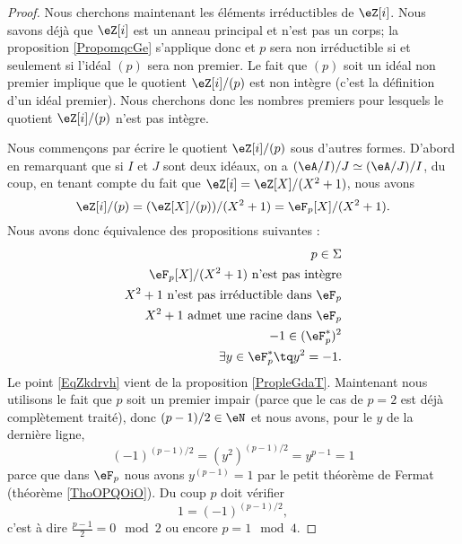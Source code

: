 \begin{proof}
    Nous cherchons maintenant les éléments irréductibles de \( \eZ[i]\). Nous savons déjà que \( \eZ[i]\) est un anneau principal et n'est pas un corps; la proposition \ref{PropomqcGe} s'applique donc et \( p\) sera non irréductible si et seulement si l'idéal \( (p)\) sera non premier. Le fait que \( (p)\) soit un idéal non premier implique que le quotient \( \eZ[i]/(p)\) est non intègre (c'est la définition d'un idéal premier). Nous cherchons donc les nombres premiers pour lesquels le quotient \( \eZ[i]/(p)\) n'est pas intègre.

    Nous commençons par écrire le quotient \( \eZ[i]/(p)\) sous d'autres formes. D'abord en remarquant que si \( I\) et \( J\) sont deux idéaux, on a \( (\eA/I)/J\simeq (\eA/J)/I\), du coup, en tenant compte du fait que \( \eZ[i]=\eZ[X]/(X^2+1)\), nous avons
    \begin{equation}
        \eZ[i]/(p)=(\eZ[X]/(p))/(X^2+1)=\eF_p[X]/(X^2+1).
    \end{equation}
    Nous avons donc équivalence des propositions suivantes :
    \begin{subequations}
        \begin{align}
            p\in\Sigma\\
            \eF_p[X]/(X^2+1)\text{ n'est pas intègre}\\
            X^2+1\text{ n'est pas irréductible dans \( \eF_p\)} \label{EqZkdrvh}\\
            \text{\( X^2+1\) admet une racine dans \( \eF_p\)}\\
            -1\in (\eF_p^*)^2\\
            \exists y\in \eF_p^*\tq y^2=-1.
        \end{align}
    \end{subequations}
    Le point \eqref{EqZkdrvh} vient de la proposition \ref{PropleGdaT}. Maintenant nous utilisons le fait que \( p\) soit un premier impair (parce que le cas de \( p=2\) est déjà complètement traité), donc \( (p-1)/2\in \eN\) et nous avons, pour le \( y\) de la dernière ligne,
    \begin{equation}
        (-1)^{(p-1)/2}=(y^2)^{(p-1)/2}=y^{p-1}=1
    \end{equation}
    parce que dans \( \eF_p\) nous avons \( y^{(p-1)}=1\) par le petit théorème de Fermat (théorème \ref{ThoOPQOiO}). Du coup \( p\) doit vérifier
    \begin{equation}
        1=(-1)^{(p-1)/2},
    \end{equation}
    c'est à dire \( \frac{ p-1 }{2}=0\mod 2\) ou encore \( p=1\mod 4\).

\end{proof}

